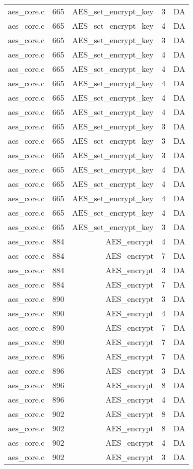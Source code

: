 \begin{table}
\begin{tabular}{clrrr}
aes\_core.c& 665&AES\_set\_encrypt\_key&3 &DA\\
aes\_core.c& 665&AES\_set\_encrypt\_key&4 &DA\\
aes\_core.c& 665&AES\_set\_encrypt\_key&3 &DA\\
aes\_core.c& 665&AES\_set\_encrypt\_key&4 &DA\\
aes\_core.c& 665&AES\_set\_encrypt\_key&4 &DA\\
aes\_core.c& 665&AES\_set\_encrypt\_key&4 &DA\\
aes\_core.c& 665&AES\_set\_encrypt\_key&4 &DA\\
aes\_core.c& 665&AES\_set\_encrypt\_key&4 &DA\\
aes\_core.c& 665&AES\_set\_encrypt\_key&3 &DA\\
aes\_core.c& 665&AES\_set\_encrypt\_key&3 &DA\\
aes\_core.c& 665&AES\_set\_encrypt\_key&3 &DA\\
aes\_core.c& 665&AES\_set\_encrypt\_key&4 &DA\\
aes\_core.c& 665&AES\_set\_encrypt\_key&4 &DA\\
aes\_core.c& 665&AES\_set\_encrypt\_key&4 &DA\\
aes\_core.c& 665&AES\_set\_encrypt\_key&4 &DA\\
aes\_core.c& 665&AES\_set\_encrypt\_key&3 &DA\\
aes\_core.c& 884&AES\_encrypt&4 &DA\\
aes\_core.c& 884&AES\_encrypt&7 &DA\\
aes\_core.c& 884&AES\_encrypt&3 &DA\\
aes\_core.c& 884&AES\_encrypt&7 &DA\\
aes\_core.c& 890&AES\_encrypt&3 &DA\\
aes\_core.c& 890&AES\_encrypt&4 &DA\\
aes\_core.c& 890&AES\_encrypt&7 &DA\\
aes\_core.c& 890&AES\_encrypt&7 &DA\\
aes\_core.c& 896&AES\_encrypt&7 &DA\\
aes\_core.c& 896&AES\_encrypt&3 &DA\\
aes\_core.c& 896&AES\_encrypt&8 &DA\\
aes\_core.c& 896&AES\_encrypt&4 &DA\\
aes\_core.c& 902&AES\_encrypt&8 &DA\\
aes\_core.c& 902&AES\_encrypt&8 &DA\\
aes\_core.c& 902&AES\_encrypt&4 &DA\\
aes\_core.c& 902&AES\_encrypt&3 &DA\\

\end{tabular}
\end{table}
